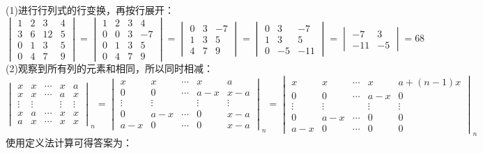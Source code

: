 \begin{solution}
    (1)进行行列式的行变换，再按行展开：\vspace{-5pt}
\[\begin{vmatrix}
    1&2&3&4\\
    3&6&12&5\\
    0&1&3&5\\
    0&4&7&9
\end{vmatrix}=\begin{vmatrix}1&2&3&4\\0&0&3&-7\\0&1&3&5\\0&4&7&9\end{vmatrix}=\begin{vmatrix}0&3&-7\\1&3&5\\4&7&9\end{vmatrix}
=\begin{vmatrix}
    0&3&-7\\
    1&3&5\\
    0&-5&-11
\end{vmatrix}=\begin{vmatrix}
    -7&3\\
    -11&-5
\end{vmatrix}=68\]
(2)观察到所有列的元素和相同，所以同时相减：\\\vspace{-5pt}\[
\begin{vmatrix}x&x&\cdots&x&a\\x&x&\cdots&a&x\\\vdots&\vdots&&\vdots&\vdots\\x&a&\cdots&x&x\\a&x&\cdots&x&x\end{vmatrix}_n=
\begin{vmatrix}x&x&\cdots&x&a\\0&0&\cdots&a-x&x-a\\\vdots&\vdots&&\vdots&\vdots\\0&a-x&\cdots&0&x-a\\a-x&0&\cdots&0&x-a\end{vmatrix}_n=
\begin{vmatrix}x&x&\cdots&x&a+(n-1)x\\0&0&\cdots&a-x&0\\\vdots&\vdots&&\vdots&\vdots\\0&a-x&\cdots&0&0\\a-x&0&\cdots&0&0\end{vmatrix}_n\]
使用定义法计算可得答案为：\vspace{-5pt}\[
\]
\end{solution}
